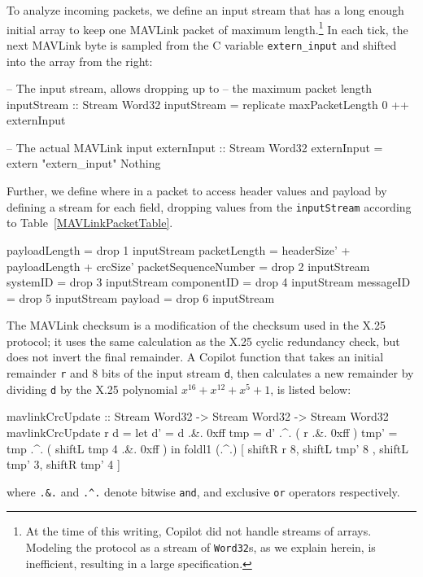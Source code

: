 To analyze incoming packets, we define an input stream that has a long enough
initial array to keep one MAVLink packet of maximum length.\footnote{At the time
  of this writing, Copilot did not handle streams of arrays.  Modeling the
  protocol as a stream of {\tt Word32}s, as we explain herein, is inefficient,
  resulting in a large specification.} In each tick, the next MAVLink byte is
sampled from the C variable {\tt extern\_input} and shifted into the array from
the right:

\begin{code}
-- The input stream, allows dropping up to
-- the maximum packet length
inputStream :: Stream Word32
inputStream = replicate maxPacketLength 0 ++ externInput

-- The actual MAVLink input
externInput :: Stream Word32
externInput = extern "extern_input" Nothing
\end{code}


Further, we define where in a packet to access header values and payload by
defining a stream for each field, dropping values from the {\tt inputStream}
according to Table~\ref{MAVLinkPacketTable}.

\begin{code}
payloadLength         = drop 1 inputStream
packetLength          = headerSize' + payloadLength
                                    + crcSize'
packetSequenceNumber  = drop 2 inputStream
systemID              = drop 3 inputStream
componentID           = drop 4 inputStream
messageID             = drop 5 inputStream
payload               = drop 6 inputStream
\end{code}


The MAVLink checksum is a modification of the checksum used in the X.25
protocol; it uses the same calculation as the X.25 cyclic redundancy check, but
does not invert the final remainder. A Copilot function that takes an initial
remainder {\tt r} and 8 bits of the input stream {\tt d}, then calculates a new
remainder by dividing {\tt d} by the X.25 polynomial $x^{16} + x^{12} + x^5 +
1$, is listed below:

\begin{code}
mavlinkCrcUpdate :: Stream Word32 -> Stream Word32
                                  -> Stream Word32
mavlinkCrcUpdate r d =
let d'   = d   .&. 0xff
    tmp  = d'  .^. ( r .&. 0xff )
    tmp' = tmp .^. ( shiftL tmp 4 .&. 0xff )
in foldl1 (.^.) [ shiftR r    8, shiftL tmp' 8
                , shiftL tmp' 3, shiftR tmp' 4 ]
\end{code}
where \texttt{.\&.} and \texttt{.\textasciicircum.} denote bitwise
{\tt and}, and exclusive {\tt or} operators respectively.

